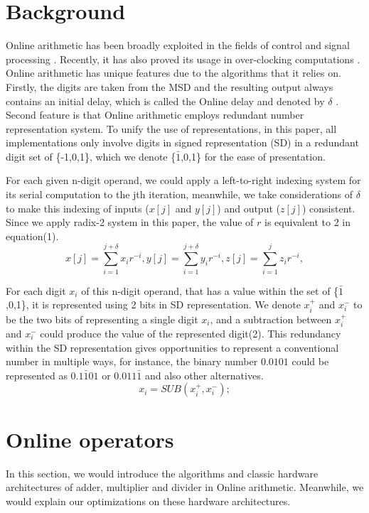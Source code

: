 \documentclass{sig-alternate}
\begin{document}
	\section{Background}
	Online arithmetic has been broadly exploited in the fields of control and signal processing \cite{online_control}\cite{online_signal_processing}. Recently, it has also proved its usage in over-clocking computations \cite{Kan_overclocking}. Online arithmetic has unique features due to the algorithms that it relies on. Firstly, the digits are taken from the MSD and the resulting output always contains an initial delay, which is called the Online delay and denoted by $\delta$ \cite{digital_arithmetic_book}. Second feature is that Online arithmetic employs redundant number representation system. To unify the use of representations, in this paper, all implementations only involve digits in signed representation (SD) in a redundant digit set of \{-1,0,1\}, which we denote \{$\bar{1}$,0,1\} for the ease of presentation. 
	
	For each given n-digit operand, we could apply a left-to-right indexing system for its serial computation to the jth iteration, meanwhile, we take considerations of $\delta$ to make this indexing of inputs ($x[j]$ and $y[j]$) and output ($z[j]$) consistent. Since we apply radix-2 system in this paper,  the value of $r$ is equivalent to 2 in equation(1)\cite{digital_arithmetic_book}.
	\begin{equation}
	 x[j]=\sum_{i=1}^{j+\delta}x_{i}r^{-i},y[j]=\sum_{i=1}^{j+\delta}y_{i}r^{-i},z[j]=\sum_{i=1}^{j}z_{i}r^{-i},
	\end{equation}
	
	For each digit $x_{i}$ of this n-digit operand, that has a value within the set of  \{$\bar{1}$,0,1\},  it is represented using 2  bits in SD representation. We denote $x_i^+$ and $x_i^-$ to be the two bits of representing a single digit $x_{i}$, and a subtraction between $x_i^+$ and $x_i^-$ could produce the value of the represented digit(2). This redundancy within the SD representation gives opportunities to represent a conventional number in multiple ways, for instance, the binary number $0.0101$ could be represented as $0.1\bar{1}01$ or $0.011\bar{1}$ and also other alternatives. 
	\begin{equation}
		x_{i}= SUB (x_i^+,x_i^-);
	\end{equation}
	\section{Online operators}
	In this section, we would introduce the algorithms and classic hardware architectures of adder, multiplier and divider in Online arithmetic. Meanwhile, we would explain our optimizations on these hardware architectures.   
\end{document}
